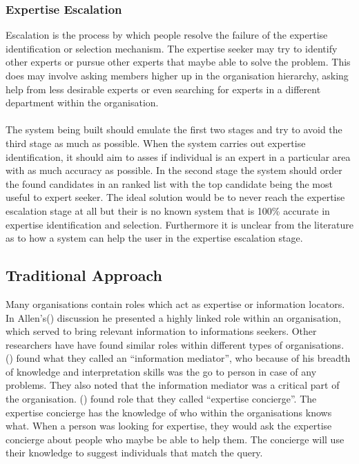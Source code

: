 \documentclass[a4paper,oneside,11pt]{report}
\begin{document}
\subsubsection{Expertise Escalation} 
Escalation is the process by which people resolve the failure of the expertise identification or selection mechanism. The expertise seeker may try to identify other experts or pursue other experts that maybe able to solve the problem.  This does may involve asking members higher up in the organisation hierarchy, asking help from less desirable experts or even searching for experts in a different department within the organisation\autocite{mcdonalackerman1998}.
\\
\\
The system being built should emulate the first two stages and try to avoid the third stage as much as possible. When the system carries out expertise identification, it should aim to asses if individual is an expert in a particular area with as much accuracy as possible. In the second stage the system should order the found candidates in an ranked list with the top candidate being the most useful to expert seeker. The ideal solution would be to never reach the expertise escalation stage at all but their is no known system that is 100\% accurate in expertise identification and selection. Furthermore it is unclear from the literature as to how a system can help the user in the expertise escalation stage.

\subsection{Traditional Approach}
Many organisations contain roles which act as expertise or information locators.
In Allen's(\citeyear{allen1977}) discussion he presented a highly linked role within an organisation, which served to bring relevant information to informations seekers. Other researchers have have found similar roles within different types of organisations. \citeauthor{ehrlichcash1994}(\citeyear{ehrlichcash1994}) found what they called an \enquote{information mediator}, who because of his breadth of knowledge and interpretation skills was the go to person in case of any problems. They also noted that the information mediator was a critical part of the organisation. \citeauthor{mcdonalackerman1998}(\citeyear{mcdonalackerman1998}) found role that they called \enquote{expertise concierge}. The expertise concierge has the knowledge of who within the organisations knows what. When a person was looking for expertise, they would ask the expertise concierge about people who maybe be able to help them. The concierge will use their knowledge to suggest individuals that match the query.
\end{document}
